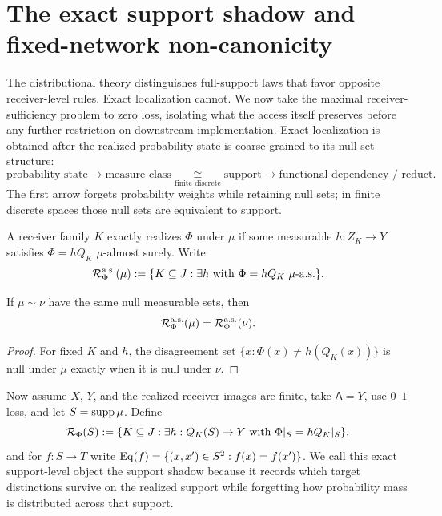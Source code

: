 \section{The exact support shadow and fixed-network non-canonicity}
\label{sec:exact-shadow}
\label{sec:support-shadow}
\label{sec:support-universality}

The distributional theory distinguishes full-support laws that favor opposite receiver-level rules. Exact localization cannot. We now take the maximal receiver-sufficiency problem to zero loss, isolating what the access itself preserves before any further restriction on downstream implementation. Exact localization is obtained after the realized probability state is coarse-grained to its null-set structure:
\begin{equation}
\boxed{
\text{probability state}
\longrightarrow
\text{measure class}
\underset{\text{finite discrete}}{\cong}
\text{support}
\longrightarrow
\text{functional dependency / reduct}.
}
\label{eq:coarse-chain}
\end{equation}
The first arrow forgets probability weights while retaining null sets; in finite discrete spaces those null sets are equivalent to support.

A receiver family $K$ exactly realizes $\Phi$ under $\mu$ if some measurable $h:Z_K\to Y$ satisfies $\Phi=hQ_K$ $\mu$-almost surely. Write
\[
\Rcal_\Phi^{\mathrm{a.s.}}(\mu)
:=
\{K\subseteq J:\exists h\text{ with }\Phi=hQ_K\ \mu\text{-a.s.}\}.
\]

\begin{proposition}
\label{thm:measure-class-invariance}
If $\mu\sim\nu$ have the same null measurable sets, then
\[
\mathcal{R}_\Phi^{\mathrm{a.s.}}(\mu)
=
\mathcal{R}_\Phi^{\mathrm{a.s.}}(\nu).
\]
\end{proposition}
\begin{proof}
For fixed $K$ and $h$, the disagreement set $\{x:\Phi(x)\neq h(Q_K(x))\}$ is null under $\mu$ exactly when it is null under $\nu$.
\end{proof}

Now assume $X$, $Y$, and the realized receiver images are finite, take $\mathsf A=Y$, use $0$--$1$ loss, and let $S=\operatorname{supp}\mu$. Define
\[
\mathcal{R}_\Phi(S)
:=
\{K\subseteq J:\exists h:Q_K(S)\to Y\text{ with }\Phi|_S=hQ_K|_S\},
\]
and for $f:S\to T$ write $\operatorname{Eq}(f)=\{(x,x')\in S^2:f(x)=f(x')\}$. We call this exact support-level object the support shadow because it records which target distinctions survive on the realized support while forgetting how probability mass is distributed across that support.

